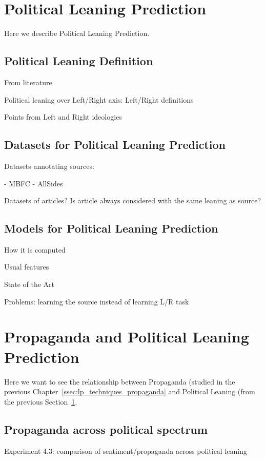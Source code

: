 \section{Political Leaning Prediction}
\label{sec:ps_political_sides}

Here we describe Political Leaning Prediction.

\subsection{Political Leaning Definition}

From literature

Political leaning over Left/Right axis: Left/Right definitions

Points from Left and Right ideologies

\subsection{Datasets for Political Leaning Prediction}

Datasets annotating sources:

- MBFC
- AllSides

Datasets of articles? Is article always considered with the same leaning as source?

\subsection{Models for Political Leaning Prediction}

How it is computed

Usual features

State of the Art

Problems: learning the source instead of learning L/R task

\section{Propaganda and Political Leaning Prediction}

Here we want to see the relationship between Propaganda (studied in the previous Chapter~\ref{ssec:lp_techniques_propaganda} and Political Leaning (from the previous Section~\ref{sec:ps_political_sides}.

\subsection{Propaganda across political spectrum}
Experiment 4.3: comparison of sentiment/propaganda across political leaning

